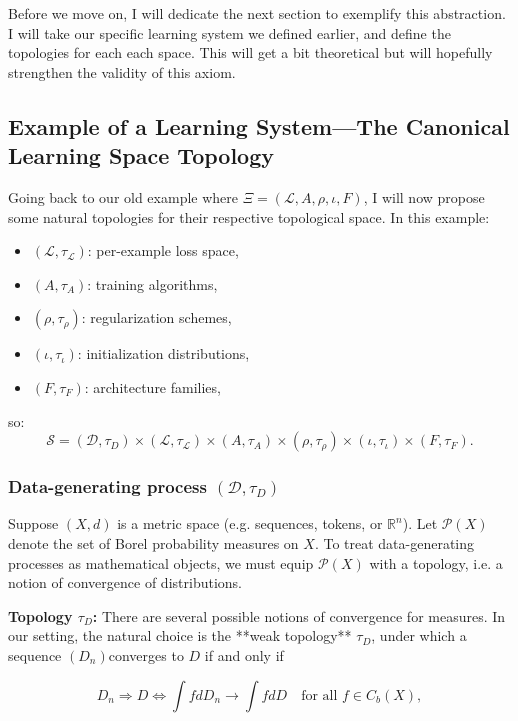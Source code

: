 \documentclass[12pt]{article}
\begin{document}
Before we move on, I will dedicate the next section to exemplify this abstraction. I will take our specific learning system we defined earlier, and define the topologies for each each space. This will get a bit theoretical but will hopefully strengthen the validity of this axiom.

\subsection{Example of a Learning System—The Canonical Learning Space Topology}

Going back to our old example where $\Xi=(\mathcal L, A, \rho, \iota, F)$, I will now propose some natural topologies for their respective topological space. In this example:

\begin{itemize}
    \item $(\mathcal L, \tau_{\mathcal L})$: per-example loss space,
    \item $(A, \tau_A)$: training algorithms,
    \item $(\rho, \tau_\rho)$: regularization schemes,
    \item $(\iota, \tau_\iota)$: initialization distributions,
    \item $(F, \tau_F)$: architecture families,
\end{itemize}
so:
\[
\mathcal S = (\mathcal D, \tau_D)\times (\mathcal L, \tau_{\mathcal L}) \times (A,\tau_A) \times (\rho,\tau_\rho) \times (\iota,\tau_\iota) \times (F,\tau_F).
\]

\subsubsection{Data-generating process $(\mathcal D, \tau_D)$}

Suppose $(X,d)$ is a metric space (e.g. sequences, tokens, or $\mathbb R^n$). Let $\mathcal P(X)$ denote the set of Borel probability measures on $X$. To treat data-generating processes as mathematical objects, we must equip $\mathcal P(X)$ with a topology, i.e. a notion of convergence of distributions.

\textbf{Topology $\tau_D$:} There are several possible notions of convergence for measures. In our setting, the natural choice is the **weak topology** $\tau_D$, under which a sequence $(D_n)$converges to $D$ if and only if

\[
D_n \Rightarrow D 
 \iff 
\int f  dD_n \longrightarrow \int f  dD
\quad \text{for all } f \in C_b(X),
\]
\end{document}
